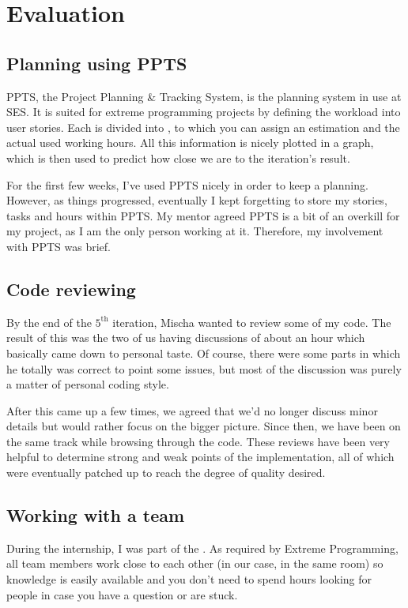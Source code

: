 \chapter{Evaluation}

\section{Planning using PPTS}

PPTS, the Project Planning \& Tracking System, is the planning system in use at SES. It is suited for extreme programming projects by defining the workload into user stories. Each  is divided into , to which you can assign an estimation and the actual used working hours. All this information is nicely plotted in a graph, which is then used to predict how close we are to the iteration's result.

For the first few weeks, I've used PPTS nicely in order to keep a planning. However, as things progressed, eventually I kept forgetting to store my stories, tasks and hours within PPTS. My mentor agreed PPTS is a bit of an overkill for my project, as I am the only person working at it. Therefore, my involvement with PPTS was brief.

\section{Code reviewing}

By the end of the $5^\textrm{th}$ iteration, Mischa wanted to review some of my code. The result of this was the two of us having discussions of about an hour which basically came down to personal taste. Of course, there were some parts in which he totally was correct to point some issues, but most of the discussion was purely a matter of personal coding style.

After this came up a few times, we agreed that we'd no longer discuss minor details but would rather focus on the bigger picture. Since then, we have been on the same track while browsing through the code. These reviews have been very helpful to determine strong and weak points of the implementation, all of which were eventually patched up to reach the degree of quality desired.

\section{Working with a team}

During the internship, I was part of the . As required by Extreme Programming, all team members work close to each other (in our case, in the same room) so knowledge is easily available and you don't need to spend hours looking for people in case you have a question or are stuck.

